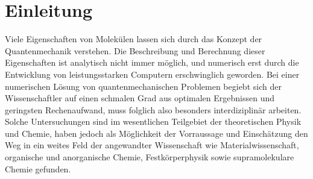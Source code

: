 %
%

\section{Einleitung}


Viele Eigenschaften von Molekülen lassen sich durch das Konzept der Quantenmechanik verstehen. Die Beschreibung und Berechnung dieser Eigenschaften ist analytisch nicht immer möglich, und numerisch erst durch die Entwicklung von leistungsstarken Computern erschwinglich geworden. Bei einer numerischen Lösung von quantenmechanischen Problemen begiebt sich der Wissenschaftler auf einen schmalen Grad aus optimalen Ergebnissen und geringsten Rechenaufwand, muss folglich also besonders interdiziplinär arbeiten. Solche Untersuchungen sind im wesentlichen Teilgebiet der theoretischen Physik und Chemie, haben jedoch als Möglichkeit der Vorraussage und Einschätzung den Weg in ein weites Feld der angewandter Wissenschaft wie Materialwissenschaft, organische und anorganische Chemie, Festkörperphysik sowie supramolekulare Chemie gefunden.


%

